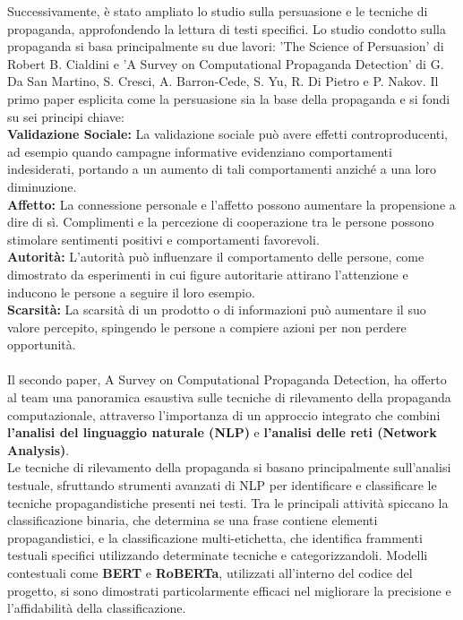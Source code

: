 \documentclass[12pt]{article}
\begin{document}
Successivamente, è stato ampliato lo studio sulla persuasione e le tecniche di propaganda, approfondendo la lettura di testi specifici.
Lo studio condotto sulla propaganda si basa principalmente su due lavori: 'The Science of Persuasion' di Robert B. Cialdini e 'A Survey on Computational Propaganda Detection' di G. Da San Martino, S. Cresci, A. Barron-Cede, S. Yu, R. Di Pietro e P. Nakov.
Il primo paper esplicita come la persuasione sia la base della propaganda e si fondi su sei principi chiave:\\
\textbf{Validazione Sociale:} La validazione sociale può avere effetti controproducenti, ad esempio quando campagne informative evidenziano comportamenti indesiderati, portando a un aumento di tali comportamenti anziché a una loro diminuzione.\\
\textbf{Affetto:} La connessione personale e l'affetto possono aumentare la propensione a dire di sì. Complimenti e la percezione di cooperazione tra le persone possono stimolare sentimenti positivi e comportamenti favorevoli.\\
\textbf{Autorità:} L'autorità può influenzare il comportamento delle persone, come dimostrato da esperimenti in cui figure autoritarie attirano l'attenzione e inducono le persone a seguire il loro esempio.\\
\textbf{Scarsità:} La scarsità di un prodotto o di informazioni può aumentare il suo valore percepito, spingendo le persone a compiere azioni per non perdere opportunità.\\
\\
Il secondo paper, A Survey on Computational Propaganda Detection, ha offerto al team una panoramica  esaustiva sulle tecniche di rilevamento della propaganda computazionale, attraverso l'importanza di un approccio integrato che combini \textbf{l'analisi del linguaggio naturale (NLP)} e \textbf{l'analisi delle reti (Network Analysis)}.\\
Le tecniche di rilevamento della propaganda si basano principalmente sull'analisi testuale, sfruttando strumenti avanzati di NLP per identificare e classificare le tecniche propagandistiche presenti nei testi. Tra le principali attività spiccano la classificazione binaria, che determina se una frase contiene elementi propagandistici, e la classificazione multi-etichetta, che identifica frammenti testuali specifici utilizzando determinate tecniche e categorizzandoli. Modelli contestuali come \textbf{BERT} e \textbf{RoBERTa}, utilizzati all'interno del codice del progetto, si sono dimostrati particolarmente efficaci nel migliorare la precisione e l'affidabilità della classificazione.\\
\end{document}
